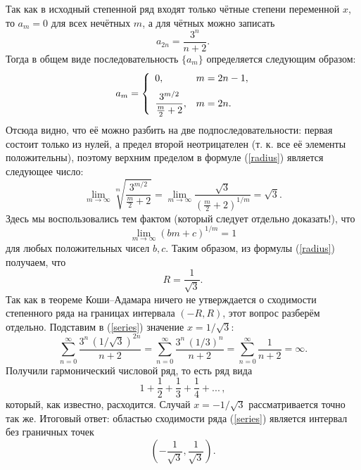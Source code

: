 \documentclass[12pt]{article}
\begin{document}
Так как в исходный степенной ряд входят только чётные степени переменной $x$, то $a_m = 0$ для всех нечётных $m$, а для чётных можно записать
\begin{equation*}
    a_{2n} = \frac{3^n}{n + 2}.
\end{equation*}
Тогда в общем виде последовательность $\{a_m\}$ определяется следующим образом:
\begin{equation*}
    a_m = 
    \begin{cases}
        \enskip 0, & m = 2n - 1, \vspace{2mm} \\
        \enskip\displaystyle\frac{3^{m/2}}{\frac{m}{2} + 2}, & m = 2n.
    \end{cases}
\end{equation*}
Отсюда видно, что её можно разбить на две подпоследовательности: первая состоит только из нулей, а предел второй неотрицателен (т. к. все её элементы положительны), поэтому верхним пределом в формуле (\ref{radius}) является следующее число:
\begin{equation*}
    \lim_{m\to\infty} \sqrt[m]{\frac{3^{m/2}}{\frac{m}{2} + 2}} = \lim_{m\to\infty} \frac{\sqrt{3}}{\left(\frac{m}{2} + 2\right)^{1/m}} = \sqrt{3}.
\end{equation*}
Здесь мы воспользовались тем фактом (который следует отдельно доказать!), что
\begin{equation*}
    \lim_{m\to\infty} \left(bm + c\right)^{1/m} = 1
\end{equation*}
для любых положительных чисел $b, c$. Таким образом, из формулы (\ref{radius}) получаем, что
\begin{equation*}
    R = \frac{1}{\sqrt{3}}.
\end{equation*}
Так как в теореме Коши--Адамара ничего не утверждается о сходимости степенного ряда на границах интервала $(-R, R)$, этот вопрос разберём отдельно. Подставим в (\ref{series}) значение $x = 1/\sqrt{3}:$
\begin{equation*}
    \sum\limits_{n=0}^{\infty} \frac{3^n\, (1/\sqrt{3})^{2n}}{n+2} = \sum\limits_{n=0}^{\infty} \frac{3^n\, (1/3)^n}{n+2} = \sum\limits_{n=0}^{\infty} \frac{1}{n+2} = \infty.
\end{equation*}
Получили гармонический числовой ряд, то есть ряд вида
\begin{equation*}
    1 + \frac{1}{2} + \frac{1}{3} + \frac{1}{4} + ...\,,
\end{equation*}
который, как известно, расходится. Случай $x = -1/\sqrt{3}$ рассматривается точно так же. Итоговый ответ: областью сходимости ряда (\ref{series}) является интервал без граничных точек
\begin{equation*}
    \left(-\frac{1}{\sqrt{3}}, \frac{1}{\sqrt{3}} \right).
\end{equation*}
\end{document}
